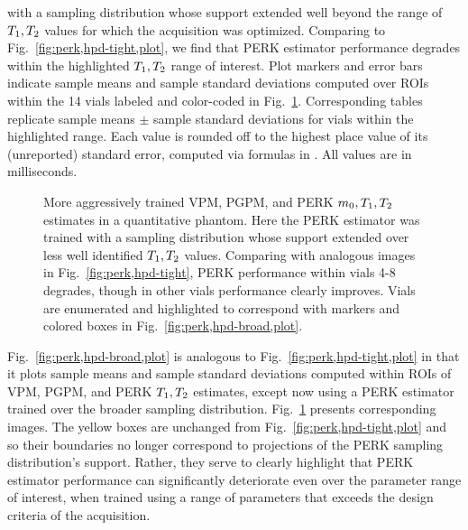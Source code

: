 \begin{figure*}[!t]
{		with a sampling distribution
		whose support extended 
		well beyond the range of $T_1,T_2$ values
		for which the acquisition was optimized.
		Comparing to Fig.~\ref{fig:perk,hpd-tight,plot},
		we find that PERK estimator performance degrades 
		within the highlighted $T_1,T_2$ range of interest.
		Plot markers and error bars
		indicate sample means and sample standard deviations
		computed over ROIs
		within the 14 vials
		labeled and color-coded
		in Fig.~\ref{fig:perk,hpd-broad}.
		Corresponding tables replicate 
		sample means $\pm$ sample standard deviations
		for vials within the highlighted range.
		Each value is rounded off
		to the highest place value 
		of its (unreported) standard error,
		computed via formulas in \cite{ahn:03:seo}.
		All values are in milliseconds.
	}
	\label{fig:perk,hpd-broad,plot}
\end{figure*}

\begin{figure}[!t]
	\centering
	\begin{minipage}{\textwidth}
  	\hspace{0cm}
  	\hspace{0cm}
	\end{minipage}
	\caption{%
		More aggressively trained 
		VPM, PGPM, and PERK $m_0,T_1,T_2$ estimates
		in a quantitative phantom.
		Here the PERK estimator was trained
		with a sampling distribution
		whose support extended
		over less well identified $T_1,T_2$ values.
		Comparing with analogous images 
		in Fig.~\ref{fig:perk,hpd-tight},
		PERK performance within vials 4-8 degrades,
		though in other vials 
		performance clearly improves. 
		Vials are enumerated and highlighted
		to correspond with markers and colored boxes
		in Fig.~\ref{fig:perk,hpd-broad,plot}.
	}
	\label{fig:perk,hpd-broad}
\end{figure}

Fig.~\ref{fig:perk,hpd-broad,plot} 
is analogous to Fig.~\ref{fig:perk,hpd-tight,plot}
in that it plots sample means and sample standard deviations
computed within ROIs 
of VPM, PGPM, and PERK $T_1,T_2$ estimates,
except now using a PERK estimator trained
over the broader sampling distribution.
Fig.~\ref{fig:perk,hpd-broad} presents corresponding images. 
The yellow boxes are unchanged
from Fig.~\ref{fig:perk,hpd-tight,plot}
and so their boundaries no longer correspond
to projections of the PERK sampling distribution's support.
Rather,
they serve to clearly highlight 
that PERK estimator performance
can significantly deteriorate
even over the parameter range of interest,
when trained using a range of parameters
that exceeds the design criteria
of the acquisition.

